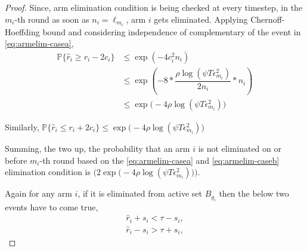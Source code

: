 \begin{proof}
Since, arm elimination condition is being checked at every timestep, in the $m_{i}$-th round as soon as $n_{i}=\ell_{m_{i}}$, arm $i$ gets eliminated. Applying Chernoff-Hoeffding bound and considering independence of complementary of the event in \ref{eq:armelim-casea},
  \begin{align*}
\mathbb{P}\lbrace\hat{r}_{i}\geq r_{i} - 2c_{i}\rbrace &\leq \exp(-4 c_{i}^{2}n_{i})\\
&\leq \exp(-8 * \dfrac{\rho\log (\psi T\epsilon_{m_{i}}^{2})}{2 n_{i}} *n_{i})\\
&\leq \exp\big(-4\rho\log (\psi T\epsilon_{m_{i}}^{2})\big)
  \end{align*}
  

Similarly, $\mathbb{P}\lbrace\hat{r}_{i}\leq r_{i} + 2c_{i}\rbrace\leq \exp\big(-4\rho\log (\psi T\epsilon_{m_{i}}^{2})\big)$
 

Summing, the two up, the probability that an arm ${i}$ is not eliminated on or before $m_{i}$-th round based on the \ref{eq:armelim-casea} and \ref{eq:armelim-caseb} elimination condition is  $\bigg(2\exp\big(-4\rho\log (\psi T\epsilon_{m_{i}}^{2})\big)\bigg)$. 


Again for any arm $i$, if it is eliminated from active set $B_{g_{i}}$ then the below two events have to come true,
\begin{align}
\hat{r}_{i} + s_{i} < \tau - s_{i}, \label{eq:armelim-var-casea}\\
\hat{r}_{i} - s_{i} > \tau + s_{i}, \label{eq:armelim-var-caseb}
\end{align}


\end{proof}

